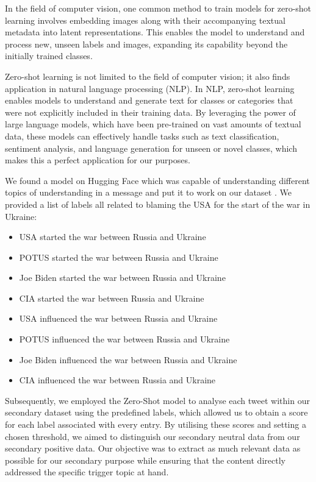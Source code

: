 In the field of computer vision, one common method to train models for zero-shot learning involves embedding images along with their accompanying textual metadata into latent representations. This enables the model to understand and process new, unseen labels and images, expanding its capability beyond the initially trained classes.

Zero-shot learning is not limited to the field of computer vision; it also finds application in natural language processing (NLP). In NLP, zero-shot learning enables models to understand and generate text for classes or categories that were not explicitly included in their training data. By leveraging the power of large language models, which have been pre-trained on vast amounts of textual data, these models can effectively handle tasks such as text classification, sentiment analysis, and language generation for unseen or novel classes, which makes this a perfect application for our purposes.

We found a model on Hugging Face which was capable of understanding different topics of understanding in a message and put it to work on our dataset \cite{ZS}. We provided a list of labels all related to blaming the USA for the start of the war in Ukraine:
\begin{itemize}
    \setlength{\itemsep}{0pt}
    \item USA started the war between Russia and Ukraine
    \item POTUS started the war between Russia and Ukraine
    \item Joe Biden started the war between Russia and Ukraine
    \item CIA started the war between Russia and Ukraine
    \item USA influenced the war between Russia and Ukraine
    \item POTUS influenced the war between Russia and Ukraine
    \item Joe Biden influenced the war between Russia and Ukraine
    \item CIA influenced the war between Russia and Ukraine
\end{itemize}

Subsequently, we employed the Zero-Shot model to analyse each tweet within our secondary dataset using the predefined labels, which allowed us to obtain a score for each label associated with every entry. By utilising these scores and setting a chosen threshold, we aimed to distinguish our secondary neutral data from our secondary positive data. Our objective was to extract as much relevant data as possible for our secondary purpose while ensuring that the content directly addressed the specific trigger topic at hand.

